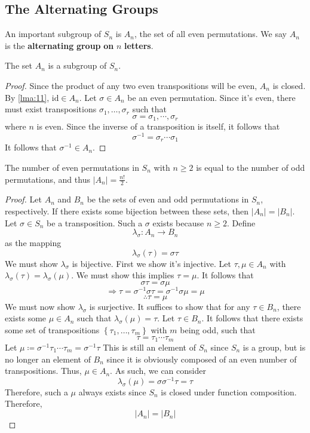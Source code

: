 \documentclass[12pt, letterpaper]{report}
\begin{document}
\subsection*{The Alternating Groups}
An important subgroup of \(S_n\) is \(A_n\), the set of all even permutations. We say \(A_n\) is the \textbf{alternating} \textbf{group} \textbf{on} \(n\) \textbf{letters}.
\begin{theorem}
	The set \(A_n\) is a subgroup of \(S_n\).
\end{theorem}
\begin{proof}
	Since the product of any two even transpositions will be even, \(A_n\) is closed. By \ref{lma:11}, \(\text{id}\in A_n \). Let \(\sigma \in A_n\) be an even permutation. Since it's even, there must exist transpositions \(\sigma _1,\ldots,\sigma _r\) such that 
	\[
		\sigma = \sigma _1,\cdots,\sigma _r
	\]
	where \(n\) is even. Since the inverse of a transposition is itself, it follows that 
	\[
		\sigma ^{-1} = \sigma _r \cdots \sigma_1
	\]
	It follows that \(\sigma ^{-1} \in A_n\).
\end{proof}
\begin{proposition}
	The number of even permutations in \(S_n\) with \(n\geq 2\) is equal to the number of odd permutations, and thus \(\vert A_n \vert =\frac{n!}{2} \).
\end{proposition}
\begin{proof}
	Let \(A_n\) and \(B_n\) be the sets of even and odd permutations in \(S_n\), respectively. If there exists some bijection between these sets, then \(\vert A_n \vert = \vert B_n \vert  \). Let \(\sigma \in S_n\) be a transposition. Such a \(\sigma \) exists because \(n\geq 2\). Define 
	\[
		\lambda _\sigma :A_n \to B_n
	\]
	as the mapping 
	\[
		\lambda _\sigma (\tau )=\sigma \tau 
	\]
	We must show \(\lambda _\sigma \) is bijective. First we show it's injective. Let \(\tau ,\mu \in A_n\) with \(\lambda _\sigma (\tau )=\lambda _\sigma (\mu )\). We must show this implies \(\tau =\mu \). It follows that
	\[
		\sigma \tau =\sigma \mu 
	\]
	\[
		\Longrightarrow \tau =\sigma ^{-1} \sigma \tau =\sigma ^{-1} \sigma \mu =\mu 
	\]
	\[
		\therefore \tau =\mu 
	\]
	We must now show \(\lambda _\sigma \) is surjective. It suffices to show that for any \(\tau \in B_n\), there exists some \(\mu \in A_n\) such that \(\lambda _\sigma (\mu )=\tau \). Let \(\tau \in B_n\). It follows that there exists some set of transpositions \(\left\{ \tau _1,\ldots,\tau _m \right\} \) with \(m\) being odd, such that 
	\[
		\tau =\tau _1 \cdots \tau _m
	\]
	Let \(\mu \coloneqq \sigma ^{-1} \tau _1 \cdots \tau _m = \sigma ^{-1} \tau \) 
	This is still an element of \(S_n\) since \(S_n\) is a group, but is no longer an element of \(B_n\) since it is obviously composed of an even number of transpositions. Thus, \(\mu \in A_n\). As such, we can consider 
	\[
		\lambda _\sigma (\mu )= \sigma \sigma ^{-1} \tau = \tau 
	\]
	Therefore, such a \(\mu \) always exists since \(S_n\) is closed under function composition. Therefore, 
	\[
		\left\vert A_n \right\vert = \left\vert B_n \right\vert
	\]
\end{proof}
\end{document}
